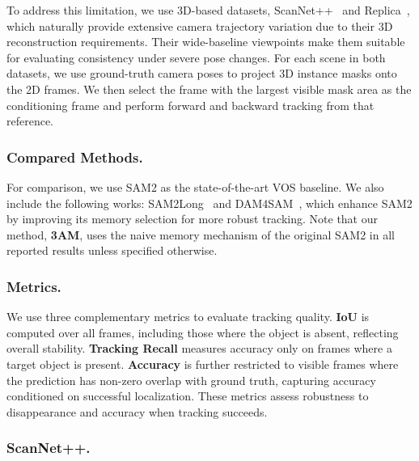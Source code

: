 To address this limitation, we use 3D-based datasets, ScanNet++~\cite{yeshwanth2023scannet++} and Replica~\cite{replica19arxiv}, which naturally provide extensive camera trajectory variation due to their 3D reconstruction requirements.  
Their wide-baseline viewpoints make them suitable for evaluating consistency under severe pose changes.
For each scene in both datasets, we use ground-truth camera poses to project 3D instance masks onto the 2D frames.  
We then select the frame with the largest visible mask area as the conditioning frame and perform forward and backward tracking from that reference.

\vspace{-1em}
\subsubsection{Compared Methods.}
For comparison, we use SAM2 as the state-of-the-art VOS baseline.  
We also include the following works: SAM2Long~\cite{ding2024sam2long} and DAM4SAM~\cite{videnovic2025distractor}, which enhance SAM2 by improving its memory selection for more robust tracking. Note that our method, \textbf{3AM}, uses the naive memory mechanism of the original SAM2 in all reported results unless specified otherwise.

\vspace{-1em}
\subsubsection{Metrics.}
We use three complementary metrics to evaluate tracking quality.
\textbf{IoU} is computed over all frames, including those where the object is absent, reflecting overall stability.
\textbf{Tracking Recall} measures accuracy only on frames where a target object is present.
\textbf{Accuracy} is further restricted to visible frames where the prediction has non-zero overlap with ground truth, capturing accuracy conditioned on successful localization.
These metrics assess robustness to disappearance and accuracy when tracking succeeds.

\vspace{-1em}
\subsubsection{ScanNet++.}

